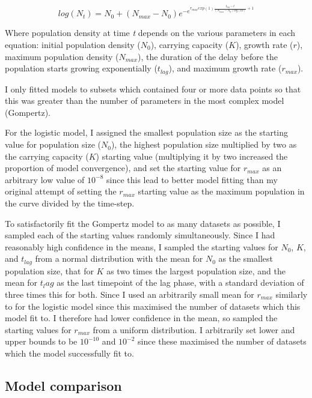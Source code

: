 \documentclass[11pt]{article}
\begin{document}
	\begin{equation}
		log(N_t) = N_0 + (N_{max} - N_0)e^{-e^{r_{max}exp(1)\frac{t_{lag}-t}{(N_{max}-N_0)log(10)}+1}}
	\end{equation}
	
	Where population density at time \emph{t} depends on the various parameters in each equation: initial population density ($N_0$), carrying capacity ($K$), growth rate ($r$), maximum population density ($N_{max}$), the duration of the delay before the population starts growing exponentially ($t_{lag}$), and maximum growth rate ($r_{max}$).
	
	I only fitted models to subsets which contained four or more data points so that this was greater than the number of parameters in the most complex model (Gompertz). 
	
	For the logistic model, I assigned the smallest population size as the starting value for population size ($N_0$), the highest population size multiplied by two as the carrying capacity ($K$) starting value (multiplying it by two increased the proportion of model convergence), and set the starting value for $r_{max}$ as an arbitrary low value of $10^{-8}$ since this lead to better model fitting than my original attempt of setting the $r_{max}$ starting value as the maximum population in the curve divided by the time-step.
	
	To satisfactorily fit the Gompertz model to as many datasets as possible, I sampled each of the starting values randomly simultaneously. Since I had reasonably high confidence in the means, I sampled the starting values for $N_0$, $K$, and $t_{lag}$ from a normal distribution with the mean for $N_0$ as the smallest population size, that for $K$ as two times the largest population size, and the mean for $t_lag$ as the last timepoint of the lag phase, with a standard deviation of three times this for both. Since I used an arbitrarily small mean for $r_{max}$ similarly to for the logistic model since this maximised the number of datasets which this model fit to. I therefore had lower confidence in the mean, so sampled the starting values for $r_{max}$ from a uniform distribution. I arbitrarily set lower and upper bounds to be $10^{-10}$ and $10^{-2}$ since these maximised the number of datasets which the model successfully fit to.
	
	
	\subsection{Model comparison}
	
\end{document}
